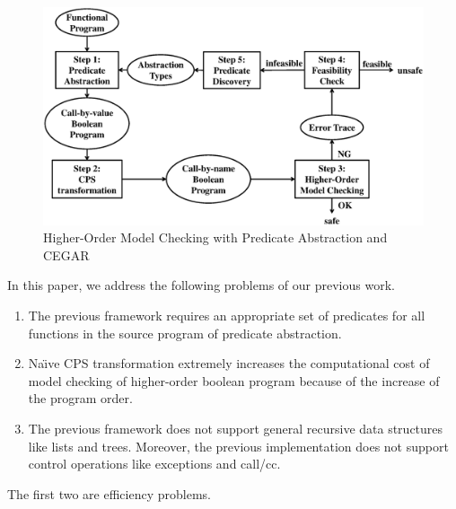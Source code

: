 \begin{figure}[tbp]
 \begin{center}
  \includegraphics[scale=0.4]{overall.eps}
 \end{center}
\caption{Higher-Order Model Checking with Predicate Abstraction and CEGAR}
\label{fig:cegar}
\end{figure}


In this paper, we address the following
problems of our previous work.
\begin{enumerate}
 \item The previous framework requires an appropriate set of predicates for all
       functions in the source program of predicate abstraction.
 \item Na\"{\i}ve CPS transformation extremely increases the computational cost
       of model checking of higher-order boolean program because of the
       increase of the program order.
 \item The previous framework does not support general recursive data
       structures like lists and trees.  Moreover, the previous
       implementation does not support control operations like
       exceptions and call/cc.
\end{enumerate}
The first two are efficiency problems.

